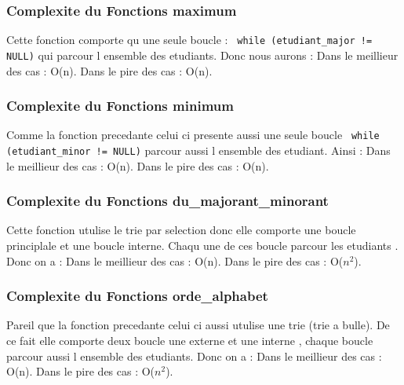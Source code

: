 \documentclass[12pt,a4paper]{article}
\begin{document}
\subsubsection{Complexite du Fonctions maximum}
Cette fonction comporte qu une seule boucle : \texttt{ while (etudiant\_major != NULL)} qui parcour l ensemble des etudiants.
Donc nous aurons :
Dans le meillieur des cas : O(n).
Dans le pire des cas : O(n).










\subsubsection{Complexite du Fonctions minimum}
Comme la fonction precedante celui ci presente aussi une seule boucle \texttt{ while (etudiant\_minor != NULL)} parcour aussi l ensemble des etudiant.
Ainsi :
Dans le meillieur des cas : O(n).
Dans le pire des cas : O(n).






\subsubsection{Complexite du Fonctions du\_majorant\_minorant}
Cette fonction utulise le trie par selection donc elle comporte une boucle principlale et une boucle interne.
Chaqu une de ces boucle parcour les etudiants .
Donc on a :
Dans le meillieur des cas : O(n).
Dans le pire des cas : O($n^2$).








\subsubsection{Complexite du Fonctions orde\_alphabet}
Pareil que la fonction precedante celui ci aussi utulise une trie (trie a bulle).
De ce fait elle comporte deux boucle une externe et une interne , chaque boucle parcour aussi l ensemble des etudiants.
Donc on a :
Dans le meillieur des cas : O(n).
Dans le pire des cas : O($n^2$).
\end{document}
